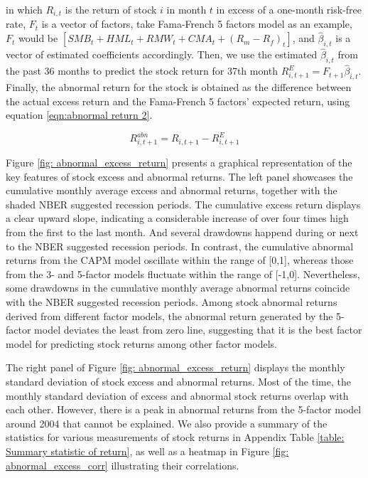 \noindent in which $R_{i,t}$ is the return of stock $i$ in month $t$ in excess of a one-month risk-free rate, $F_t$ is a vector of factors, take Fama-French 5 factors model as an example, $F_t$ would be $[SMB_t + HML_t + RMW_t + CMA_t + (R_m - R_f)_t]$, and $\hat{\beta}_{i,t}$ is a vector of estimated coefficients accordingly. Then, we use the estimated $\hat{\beta}_{i,t}$ from the past 36 months to predict the stock return for 37th month $R^E_{i,t+1} = F_{t+1}\hat{\beta}_{i,t}$. Finally, the abnormal return for the stock is obtained as the difference between the actual excess return and the Fama-French 5 factors' expected return, using equation \ref{eqn:abnormal return 2}.

\begin{equation}
  \label{eqn:abnormal return 2}
  R^{abn}_{i,t+1} = R_{i,t+1} - R^E_{i,t+1}
\end{equation}

Figure \ref{fig: abnormal_excess_return} presents a graphical representation of the key features of stock excess and abnormal returns. The left panel showcases the cumulative monthly average excess and abnormal returns, together with the shaded NBER suggested recession periods. The cumulative excess return displays a clear upward slope, indicating a considerable increase of over four times high from the first to the last month. And several drawdowns happend during or next to the NBER suggested recession periods. In contrast, the cumulative abnormal returns from the CAPM model oscillate within the range of [0,1], whereas those from the 3- and 5-factor models fluctuate within the range of [-1,0]. Nevertheless, some drawdowns in the cumulative monthly average abnormal returns coincide with the NBER suggested recession periods. Among stock abnormal returns derived from different factor models, the abnormal return generated by the 5-factor model deviates the least from zero line, suggesting that it is the best factor model for predicting stock returns among other factor models.

The right panel of Figure \ref{fig: abnormal_excess_return} displays the monthly standard deviation of stock excess and abnormal returns. Most of the time, the monthly standard deviation of excess and abnormal stock returns overlap with each other. However, there is a peak in abnormal returns from the 5-factor model around 2004 that cannot be explained. We also provide a summary of the statistics for various measurements of stock returns in Appendix Table \ref{table: Summary statistic of return}, as well as a heatmap in Figure \ref{fig: abnormal_excess_corr} illustrating their correlations.

